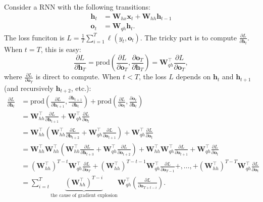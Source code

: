 Consider a RNN with the following transitions:
    \begin{equation}
        \begin{aligned}
            \bm{h}_t & = \bm{W}_{hx} \bm{x}_t + \bm{W}_{hh} \bm{h}_{t-1} \\
            \bm{o}_t & = \bm{W}_{qh} \bm{h}_t.
        \end{aligned}
    \end{equation}
The loss funciton is $L=\frac{1}{T}\sum_{i=1}^{T}{\ell(y_t, \bm{o}_t)}$.
The tricky part is to compute $\frac{\partial L}{\partial \bm{h}_t}$.
When $t=T$, this is easy:
    \begin{equation}
        \frac{\partial L}{\partial \bm{h}_T} = \text{prod}\left( \frac{\partial L}{\partial \bm{o}_T}, \frac{\partial \bm{o}_T}{\partial \bm{h}_T}  \right) = \bm{W}_{qh}^\top \frac{\partial L}{\partial \bm{o}_T},
    \end{equation}
where $\frac{\partial L}{\partial \bm{o}_T}$ is direct to compute. 
When $t < T$, the loss $L$ depends on $\bm{h}_t$ and $\bm{h}_{t+1}$ (and recursively $\bm{h}_{t+2}$, etc.):
    \begin{equation}\label{rnn-grad}
        \begin{aligned}
            \frac{\partial L}{\partial \bm{h}_t} & = \text{prod}\left( \frac{\partial L}{\partial \bm{h}_{t+1}}, \frac{\partial \bm{h}_{t+1}}{\partial  \bm{h}_{t}} \right) + \text{prod}\left( \frac{\partial L}{\partial \bm{o}_t} , \frac{\partial \bm{o}_t}{\partial \bm{h}_t} \right) \\
            & = \bm{W}_{hh}^\top \frac{\partial L}{\partial \bm{h}_{t+1}} + \bm{W}_{qh}^\top \frac{\partial L}{\partial \bm{o}_t} \\
            & = \bm{W}_{hh}^\top\left( \bm{W}_{hh}^\top \frac{\partial L}{\partial \bm{h}_{t+2}} +  \bm{W}_{qh}^\top \frac{\partial L}{\partial \bm{o}_{t+1}} \right) + \bm{W}_{qh}^\top \frac{\partial L}{\partial \bm{o}_t} \\
            & = \bm{W}_{hh}^\top \bm{W}_{hh}^\top \left( \bm{W}_{hh}^\top \frac{\partial L}{\partial \bm{h}_{t+3}} +  \bm{W}_{qh}^\top \frac{\partial L}{\partial \bm{o}_{t+2}}\right) + \bm{W}_{hh}^\top \bm{W}_{qh}^\top \frac{\partial L}{\partial \bm{o}_{t+1}}  + \bm{W}_{qh}^\top \frac{\partial L}{\partial \bm{o}_t} \\
            & = \left( \bm{W}_{hh}^\top \right)^{T-t} \bm{W}_{qh}^\top \frac{\partial L}{\partial \bm{o}_T} + \left( \bm{W}_{hh}^\top \right)^{T-t-1}\bm{W}_{qh}^\top \frac{\partial L}{\partial \bm{o}_{T-1}} +, \ldots, + \left( \bm{W}_{hh}^\top \right)^{T-T} \bm{W}_{qh}^\top \frac{\partial L}{\partial \bm{o}_t} \\
            & = \sum_{i=t}^{T}{ \underbrace{\left( \bm{W}_{hh}^\top \right)^{T-i}}_{\text{the cause of gradient explosion}} \bm{W}_{qh}^\top  } \left( \frac{\partial L}{\partial \bm{o}_{T+t-i} } \right).
        \end{aligned}
    \end{equation}
